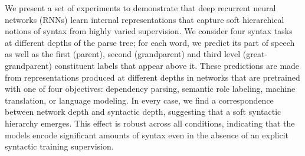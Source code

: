 We present a set of experiments to demonstrate that deep recurrent neural networks (RNNs) learn internal representations that capture soft hierarchical notions of syntax from highly varied supervision. We consider four syntax tasks at different depths of the parse tree; for each word, we predict its part of speech as well as the first (parent), second (grandparent) and third level (great-grandparent) constituent labels that appear above it. These predictions are made from representations produced at different depths in networks that are pretrained with one of four objectives: dependency parsing, semantic role labeling, machine translation, or language modeling. In every case, we find a correspondence between network depth and syntactic depth, suggesting that a soft syntactic hierarchy emerges. This effect is robust across all conditions, indicating that the models encode significant amounts of syntax even in the absence of an explicit syntactic training supervision.
